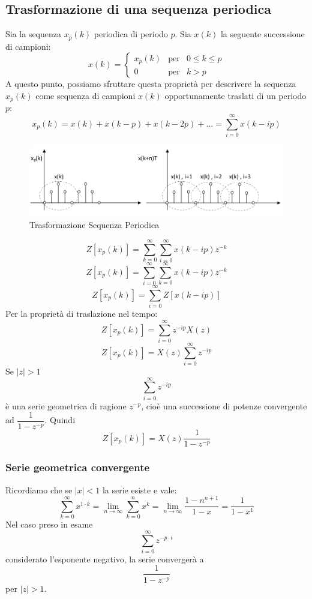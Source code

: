 \documentclass[a4paper]{report}
\begin{document}
\subsection{Trasformazione di una sequenza periodica}
Sia la sequenza $x_p(k)$ periodica di periodo $p$. Sia $x(k)$ la
seguente successione di campioni:
\[
x(k) =
\left\{
\begin{array}{lll}
  x_p(k) & \textrm{per} & 0 \leq k \leq p\\
  0 & \textrm{per} & k > p
\end{array}
\right.
\]
A questo punto, possiamo sfruttare questa propriet\`a per descrivere
la sequenza $x_p(k)$ come sequenza di campioni $x(k)$ opportunamente
traslati di un periodo $p$:
\[
x_p(k) = x(k) + x(k - p) + x(k -2p) + ... = \sum_{i = 0}^{\infty} x(k
- ip)
\]
\begin{figure}[!h]
  \begin{center}
    \includegraphics[scale=0.4]{./figures/trasformazioneSequenzaPeriodica}
    \caption{Trasformazione Sequenza
      Periodica}\label{fig:circonferenzaUnitaria} 
  \end{center}
\end{figure}
\[
Z[x_p(k)] = \sum_{k=0}^{\infty} \sum_{i = 0}^{\infty} x(k- ip) z^{-k}
\]
\[
Z[x_p(k)] = \sum_{i=0}^{\infty} \sum_{k = 0}^{\infty} x(k- ip) z^{-k}
\]
\[
Z[x_p(k)] = \sum_{i=0}^{\infty} Z[x(k - ip)]
\]
Per la propriet\`a di traslazione nel tempo:
\[
Z[x_p(k)] = \sum_{i=0}^{\infty} z^{-ip}X(z)
\]
\[
Z[x_p(k)] = X(z)\sum_{i=0}^{\infty} z^{-ip}
\]
Se $|z| > 1$ 
\[
\sum_{i=0}^{\infty} z^{-ip}
\]
\`e una serie geometrica di ragione $z^{-p}$, cio\`e una successione
di potenze convergente ad $\dfrac{1}{1 - z^{-p}}$. Quindi
\[
Z[x_p(k)] = X(z) \dfrac{1}{1 - z^{-p}}
\]

\subsubsection{Serie geometrica convergente}
Ricordiamo che se $|x| < 1$ la serie esiste e vale:
\[
\sum_{k=0}^{\infty} x^{1 \cdot k} = \lim\limits_{n \to \infty} \sum_{k=0}^{n}
x^k = \lim\limits_{n \to \infty} \dfrac{1 - n^{n + 1}}{1 - x} =
\dfrac{1}{1 - x^{1}}
\]
Nel caso preso in esame
\[
\sum_{i=0}^{\infty} z^{-p \cdot i}
\]
considerato l'esponente negativo, la serie converger\`a a
\[
\dfrac{1}{1 - z^{-p}}
\]
per $|z| > 1$.
\end{document}
